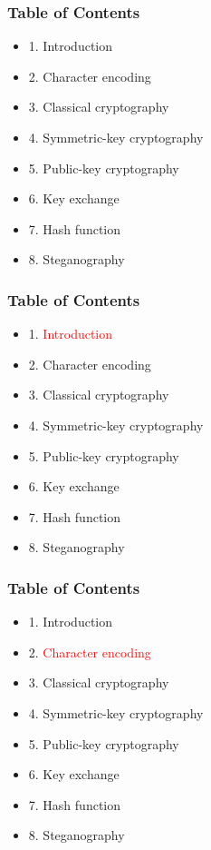 \documentclass[handout, xcolor=dvipsnames,aspectratio=169]{beamer}
\begin{document}
\begin{frame}
  \centering
  \frametitle{Table of Contents}
  \begin{itemize}
    \item 1. Introduction
    \item 2. Character encoding
    \item 3. Classical cryptography
    \item 4. Symmetric-key cryptography
    \item 5. Public-key cryptography
    \item 6. Key exchange
    \item 7. Hash function
    \item 8. Steganography
  \end{itemize}  
\end{frame}
\begin{frame}
  \centering
  \frametitle{Table of Contents}
  \begin{itemize}
    \item 1. \textcolor{red}{Introduction}
    \item 2. Character encoding
    \item 3. Classical cryptography
    \item 4. Symmetric-key cryptography
    \item 5. Public-key cryptography
    \item 6. Key exchange
    \item 7. Hash function
    \item 8. Steganography
  \end{itemize}  
\end{frame}

\begin{frame}
  \centering
  \frametitle{Table of Contents}
  \begin{itemize}
    \item 1. Introduction
    \item 2. \textcolor{red}{Character encoding}
    \item 3. Classical cryptography
    \item 4. Symmetric-key cryptography
    \item 5. Public-key cryptography
    \item 6. Key exchange
    \item 7. Hash function
    \item 8. Steganography
  \end{itemize}  
\end{frame}
\end{document}
